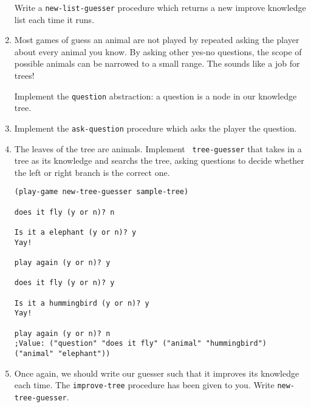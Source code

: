 \begin{enumerate}
Write a {\tt new-list-guesser} procedure which returns a new improve
knowledge list each time it runs.

\item Most games of guess an animal are not played by repeated asking
the player about every animal you know.  By asking other yes-no
questions, the scope of possible animals can be narrowed to a small
range.  The sounds like a job for trees!

Implement the {\tt question} abstraction: a question is a node in our
knowledge tree.

\item Implement the {\tt ask-question} procedure which asks the player
the question.

\item The leaves of the tree are animals.  Implement {\tt
tree-guesser} that takes in a tree as its knowledge and searchs the
tree, asking questions to decide whether the left or right branch is
the correct one.

\begin{verbatim}
(play-game new-tree-guesser sample-tree)

does it fly (y or n)? n

Is it a elephant (y or n)? y
Yay!

play again (y or n)? y

does it fly (y or n)? y

Is it a hummingbird (y or n)? y
Yay!

play again (y or n)? n
;Value: ("question" "does it fly" ("animal" "hummingbird") ("animal" "elephant"))
\end{verbatim}

\item Once again, we should write our guesser such that it improves
its knowledge each time.  The {\tt improve-tree} procedure has been
given to you.  Write {\tt new-tree-guesser}.


\end{enumerate}


